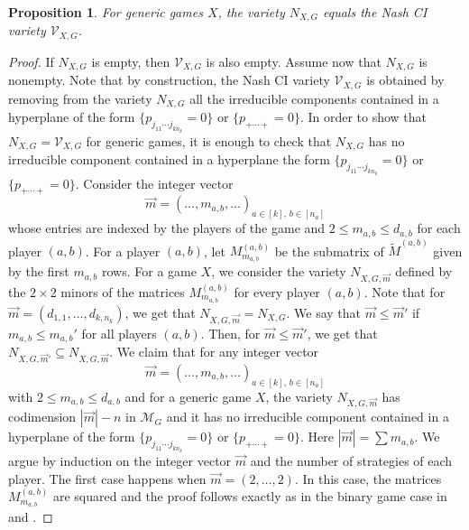 \documentclass[11pt]{amsart}
\numberwithin{equation}{section}
\theoremstyle{plain}
\numberwithin{theorem}{section}
\newtheorem{proposition}[theorem]{Proposition}
\theoremstyle{definition}
\newcommand{\Vc}{{\mathcal V}_{X,G}}
\begin{document}
\begin{proposition}\label{prop:eq Nash CI}
    For generic games $X$, the variety  $N_{X,G}$ equals the Nash CI variety $\Vc$.
\end{proposition}
\begin{proof}
If $N_{X,G}$  is empty, then  $\Vc$ is also empty. Assume now that $N_{X,G}$   is nonempty.
Note that by construction, the Nash CI variety $\Vc$ is obtained by removing from the variety  $N_{X,G}$ all the irreducible components contained in a hyperplane of the form  $\{p_{j_{11}\cdots j_{kn_k}}=0\}$ or $\{p_{+\cdots +}=0\}$. In order to show that  $N_{X,G}=\Vc$
for generic games, it is enough to check that $N_{X,G}$ has no irreducible component contained in a hyperplane  the form  $\{p_{j_{11}\cdots j_{kn_k}}=0\}$ or $\{p_{+\cdots +}=0\}$. 
 Consider the integer vector 
  $$\overrightarrow{m}=\left(\ldots,m_{a,b},\ldots \right)_{a\in[k],\,b\in[n_a]}$$
  whose entries are indexed by the players of the game and $2\leq m_{a,b}\leq d_{a,b}$ for each player $(a,b)$. For a player $(a,b)$, let $M^{(a,b)}_{m_{a,b}}$ be the submatrix of $\widetilde{M}^{(a,b)}$ given by the first $m_{a,b}$ rows. 
  For a game $X$, we consider the variety $N_{X,G,\overrightarrow{m}}$ defined by the $2\times 2$ minors of the matrices $M^{(a,b)}_{m_{a,b}}$ for every player $(a,b)$. Note that for $\overrightarrow{m}=(d_{1,1},\ldots,d_{k,n_k})$, we get that $N_{X,G,\overrightarrow{m}}=N_{X,G}$. We say that $\overrightarrow{m}\leq \overrightarrow{m}' $ if $m_{a,b}\leq m_{a,b}'$ for all players $(a,b)$. Then, for $\overrightarrow{m}\leq \overrightarrow{m}'$, we get that $N_{X,G,\overrightarrow{m}'}\subseteq N_{X,G,\overrightarrow{m}}$. We claim that for any integer vector 
 $$\overrightarrow{m}=\left(\ldots,m_{a,b},\ldots \right)_{a\in[k],\,b\in[n_a]}$$
with $2\leq m_{a,b}\leq d_{a,b}$ and for a generic game $X$, the variety $N_{X,G,\overrightarrow{m}}$ has codimension $|\overrightarrow{m}|-n$ in $\mathcal{M}_G$ and it has no irreducible component contained in a hyperplane of the form $\{p_{j_{11}\cdots j_{kn_k}}=0\}$ or $\{p_{+\cdots +}=0\}$. 
Here $|\overrightarrow{m}|=\sum m_{a,b}$. 
We argue by induction on the integer vector $\overrightarrow{m}$ and the number of strategies of each player.
The first case happens when $\overrightarrow{m}=(2,\ldots,2)$. In this case, the matrices $M^{(a,b)}_{m_{a,b}}$ are squared and the proof follows exactly as in the binary game case in \cite[Theorem 9]{portakal2024game} and \cite[Proposition 25]{portakal2024game}.



\end{proof}
\end{document}
